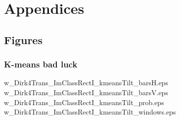 \section{Appendices}

\subsection{Figures}











\subsubsection{K-means bad luck}


w_Dirk4Trans_ImClassRectI_kmeansTilt_barsH.eps
w_Dirk4Trans_ImClassRectI_kmeansTilt_barsV.eps
w_Dirk4Trans_ImClassRectI_kmeansTilt_prob.eps
w_Dirk4Trans_ImClassRectI_kmeansTilt_windows.eps
